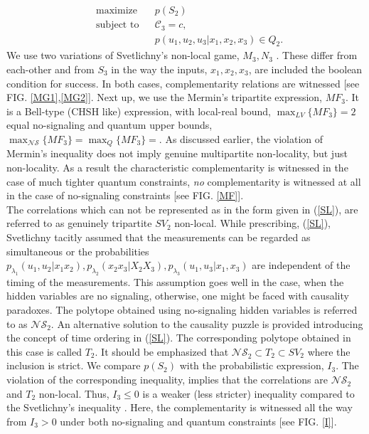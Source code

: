 \begin{widetext}
\begin{appendices}
\begin{equation*}
\begin{aligned}
& {\text{maximize}}
& & p(S_2) \\
& \text{subject to}
& & \mathcal{C}_3=c, \\
&&& p(u_1,u_2,u_3|x_1,x_2,x_3)\in {Q}_2.
\end{aligned}
\end{equation*}
We use two variations of Svetlichny's non-local game, $M_3,N_3$ \cite{barrett2005nonlocal,pironio2011extremal}. These differ from each-other and from $S_3$ in the way the inputs, $x_1,x_2,x_3$, are included the boolean condition for success. In both cases, complementarity relations are witnessed [see FIG. \ref{MG1},\ref{MG2}]. Next up, we use the Mermin's tripartite expression, $MF_3$. It is a Bell-type (CHSH like) expression, with 
local-real bound, $\max_{LV}\{MF_3\}=2$
equal no-signaling and quantum upper bounds, $\max_{\mathcal{NS}}\{MF_3\}=\max_Q\{MF_3\}=$. As discussed earlier, the violation of Mermin's inequality does not imply genuine multipartite non-locality, but just non-locality. As a result the characteristic complementarity is witnessed in the case of much tighter quantum constraints, \textit{no} complementarity is witnessed at all in the case of no-signaling constraints [see FIG. \ref{MF}]. \\
The correlations which can not be represented as in the form given in (\ref{SL}), are referred to as genuinely tripartite $SV_2$ non-local. While prescribing, (\ref{SL}), Svetlichny tacitly assumed that the measurements can 
 be regarded as simultaneous or the probabilities $p_{{\lambda}_1}(u_1,u_2|x_1x_2 ),p_{\lambda_2}(x_2 x_3|X_2X_3 ),p_{\lambda_3}(u_1,u_3|x_1,x_3 )$ are independent
of the timing of the measurements. This assumption goes well in the case, when the hidden variables are no signaling, otherwise, one might be faced with causality paradoxes. The polytope obtained using no-signaling hidden variables is referred to as $\mathcal{NS}_2$. An alternative solution to the causality puzzle is provided introducing the concept of time ordering in  
(\ref{SL}). The corresponding polytope obtained in this case is called $T_2$. It should be emphasized that $\mathcal{NS}_2 \subset T_2 \subset SV_2$ where the inclusion is strict. We compare $p(S_2)$ with the probabilistic expression, $I_3$. The violation of the corresponding inequality, implies that the correlations are $\mathcal{NS}_2$ and $T_2$ non-local.
Thus, $I_3\le0$ is a weaker (less stricter) inequality compared to the Svetlichny's inequality \cite{bancal2011definition}. Here, the complementarity is witnessed all the way from $I_3>0$ under both no-signaling and quantum constraints [see FIG. \ref{I}]. \\

\end{appendices}
\end{widetext}
